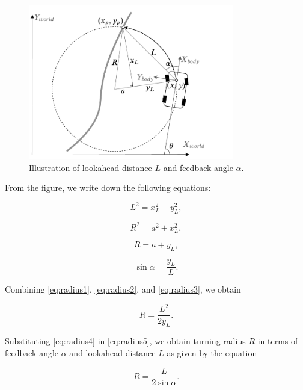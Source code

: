 \begin{figure}[h]
  \centering
  \includegraphics[width=0.8\textwidth]{figures/pure-pursuit-radius.pdf}
  \caption[Illustration of lookahead distance and feedback angle]{Illustration
    of lookahead distance $L$ and feedback angle $\alpha$.}
  \label{figure:radius}
\end{figure}

From the figure, we write down the following equations:

\begin{equation}
  L^2 = x^2_L + y^2_L,
  \label{eq:radius1}
\end{equation}

\begin{equation}
  R^2 = a^2 + x^2_L,
  \label{eq:radius2}
\end{equation}

\begin{equation}
  R = a + y_L,
  \label{eq:radius3}
\end{equation}

\begin{equation}
  \sin{\alpha} = \frac{y_L}{L}.
  \label{eq:radius4}
\end{equation}

Combining \eqref{eq:radius1}, \eqref{eq:radius2}, and \eqref{eq:radius3}, we
obtain

\begin{equation}
  R = \frac{L^2}{2y_L}.
  \label{eq:radius5}
\end{equation}

Substituting \eqref{eq:radius4} in \eqref{eq:radius5}, we obtain turning
radius $R$ in terms of feedback angle $\alpha$ and lookahead distance $L$ as
given by the equation

\begin{equation}
  R = \frac{L}{2\sin{\alpha}}.
  \label{eq:radius6}
\end{equation}


